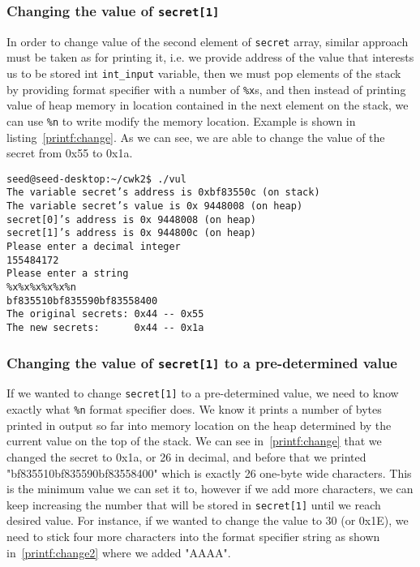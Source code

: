 \documentclass[12pt, a4paper, pdflatex]{article}
\begin{document}
\subsubsection{Changing the value of \texttt{secret[1]}}

In order to change value of the second element of \texttt{secret} array, similar approach must be taken as for printing it, i.e. we provide address of the value that interests us to be stored int \texttt{int\_input} variable, then we must pop elements of the stack by providing format specifier with a number of \texttt{\%x}s, and then instead of printing value of heap memory in location contained in the next element on the stack, we can use \texttt{\%n} to write modify the memory location. Example is shown in listing~\ref{printf:change}. As we can see, we are able to change the value of the secret from 0x55 to 0x1a.

\vspace{1em}
\lstset{
	captionpos=b,
	frame=single,
	language=BASH,
	caption=Example of overwriting memory,
	label=printf:change,
	breaklines=true,
  float=tb
}
\begin{lstlisting}
seed@seed-desktop:~/cwk2$ ./vul
The variable secret’s address is 0xbf83550c (on stack)
The variable secret’s value is 0x 9448008 (on heap)
secret[0]’s address is 0x 9448008 (on heap)
secret[1]’s address is 0x 944800c (on heap)
Please enter a decimal integer
155484172
Please enter a string
%x%x%x%x%x%n
bf835510bf835590bf83558400
The original secrets: 0x44 -- 0x55
The new secrets:      0x44 -- 0x1a
\end{lstlisting}

\subsubsection{Changing the value of \texttt{secret[1]} to a pre-determined value}

If we wanted to change \texttt{secret[1]} to a pre-determined value, we need to know exactly what \texttt{\%n} format specifier does. We know it prints a number of bytes printed in output so far into memory location on the heap determined by the current value on the top of the stack. We can see in~\ref{printf:change} that we changed the secret to 0x1a, or 26 in decimal, and before that we printed "bf835510bf835590bf83558400" which is exactly 26 one-byte wide characters. This is the minimum value we can set it to, however if we add more characters, we can keep increasing the number that will be stored in \texttt{secret[1]} until we reach desired value. For instance, if we wanted to change the value to 30 (or 0x1E), we need to stick four more characters into the format specifier string as shown in~\ref{printf:change2} where we added "AAAA".  
\end{document}
